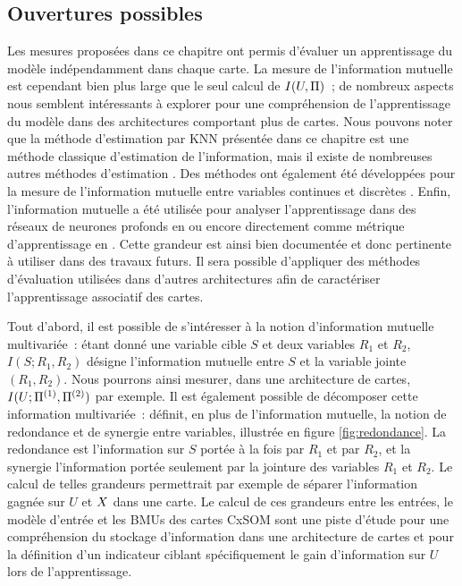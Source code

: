 \documentclass[../main]{subfiles}
\begin{document}
\subsection{Ouvertures possibles}

Les mesures proposées dans ce chapitre ont permis d'évaluer un apprentissage du modèle indépendamment dans chaque carte. La mesure de l'information mutuelle est cependant bien plus large que le seul calcul de $I(U,\Pi)$~; de nombreux aspects nous semblent intéressants à explorer pour une compréhension de l'apprentissage du modèle dans des architectures comportant plus de cartes. 
Nous pouvons noter que la méthode d'estimation par KNN présentée dans ce chapitre est une méthode classique d'estimation de l'information, mais il existe de nombreuses autres méthodes d'estimation \cite{Doquire2012ACO}. Des méthodes ont également été développées pour la mesure de l'information mutuelle entre variables continues et discrètes \cite{ross_mutual_2014, Gao2017EstimatingMI}. Enfin, l'information mutuelle a été utilisée pour analyser l'apprentissage dans des réseaux de neurones profonds en \cite{ShwartzZiv2017OpeningTB} ou encore directement comme métrique d'apprentissage en \cite{Hjelm2018LearningDR}.
Cette grandeur est ainsi bien documentée et donc pertinente à utiliser dans des travaux futurs. Il sera possible d'appliquer des méthodes d'évaluation utilisées dans d'autres architectures afin de caractériser l'apprentissage associatif des cartes.

Tout d'abord, il est possible de s'intéresser à la notion d'information mutuelle multivariée~: étant donné une variable cible $S$ et deux variables $R_1$ et $R_2$, $I(S;R_1,R_2)$ désigne l'information mutuelle entre $S$ et la variable jointe $(R_1,R_2)$. 
Nous pourrons ainsi mesurer, dans une architecture de cartes, $I(U; \Pi^{({1})}, \Pi^{({2})})$ par exemple.
Il est également possible de décomposer cette information multivariée~: \cite{williams_nonnegative_2010} définit, en plus de l'information mutuelle, la notion de redondance et de synergie entre variables, illustrée en figure \ref{fig:redondance}.
La redondance est l'information sur $S$ portée à la fois par $R_1$ et par $R_2$, et la synergie l'information portée seulement par la jointure des variables $R_1$ et $R_2$. Le calcul de telles grandeurs permettrait par exemple de séparer l'information gagnée sur $U$ et $X$ dans une carte.
Le calcul de ces grandeurs entre les entrées, le modèle d'entrée et les BMUs des cartes CxSOM sont une piste d'étude pour une compréhension du stockage d'information dans une architecture de cartes et pour la définition d'un indicateur ciblant spécifiquement le gain d'information sur $U$ lors de l'apprentissage.
\end{document}
